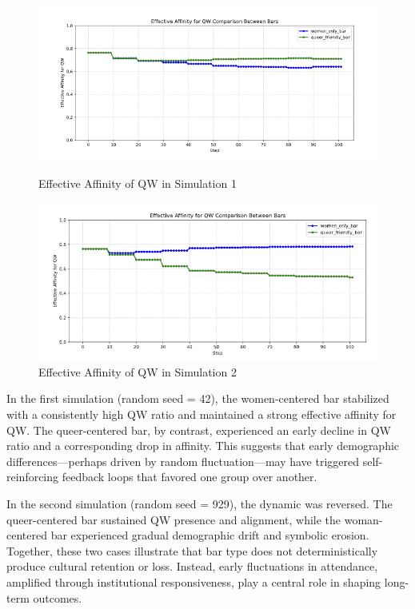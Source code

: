 \documentclass{article}
\begin{document}
\begin{figure}[H]
\centering
\begin{minipage}{0.48\textwidth}
  \centering
  \includegraphics[width=\linewidth]{figures/0.5 ea.png}
  \caption{Effective Affinity of QW in Simulation 1}
\end{minipage}
\hfill
\begin{minipage}{0.48\textwidth}
  \centering
  \includegraphics[width=\linewidth]{figures/0.5 ea2.png}
  \caption{Effective Affinity of QW in Simulation 2}
\end{minipage}
\end{figure}


In the first simulation (random seed = 42), the women-centered bar stabilized with a consistently high QW ratio and maintained a strong effective affinity for QW. The queer-centered bar, by contrast, experienced an early decline in QW ratio and a corresponding drop in affinity. This suggests that early demographic differences—perhaps driven by random fluctuation—may have triggered self-reinforcing feedback loops that favored one group over another.

In the second simulation (random seed = 929), the dynamic was reversed. The queer-centered bar sustained QW presence and alignment, while the woman-centered bar experienced gradual demographic drift and symbolic erosion. Together, these two cases illustrate that bar type does not deterministically produce cultural retention or loss. Instead, early fluctuations in attendance, amplified through institutional responsiveness, play a central role in shaping long-term outcomes.
\end{document}

